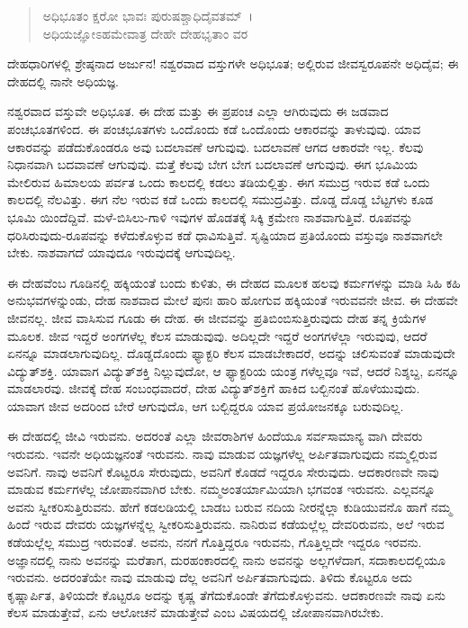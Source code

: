 \begin{verse}
ಅಧಿಭೂತಂ ಕ್ಷರೋ ಭಾವಃ ಪುರುಷಶ್ಚಾಧಿದೈವತಮ್~।\\ಅಧಿಯಜ್ಞೋಽಹಮೇವಾತ್ರ ದೇಹೇ ದೇಹಭೃತಾಂ ವರ 
\end{verse}

{\small ದೇಹಧಾರಿಗಳಲ್ಲಿ ಶ್ರೇಷ್ಠನಾದ ಅರ್ಜುನ! ನಶ್ವರವಾದ ವಸ್ತುಗಳೇ ಅಧಿಭೂತ; ಅಲ್ಲಿರುವ ಜೀವಸ್ವರೂಪನೇ ಅಧಿದೈವ; ಈ ದೇಹದಲ್ಲಿ ನಾನೇ ಅಧಿಯಜ್ಞ.}

ನಶ್ವರವಾದ ವಸ್ತುವೇ ಅಧಿಭೂತ. ಈ ದೇಹ ಮತ್ತು ಈ ಪ್ರಪಂಚ ಎಲ್ಲಾ ಆಗಿರುವುದು ಈ ಜಡವಾದ ಪಂಚಭೂತಗಳಿಂದ. ಈ ಪಂಚಭೂತಗಳು ಒಂದೊಂದು ಕಡೆ ಒಂದೊಂದು ಆಕಾರವನ್ನು ತಾಳುವುವು. ಯಾವ ಆಕಾರವನ್ನು ಪಡೆದುಕೊಂಡರೂ ಅವು ಬದಲಾವಣೆ ಆಗುವುವು. ಬದಲಾವಣೆ ಆಗದ ಆಕಾರವೇ ಇಲ್ಲ. ಕೆಲವು ನಿಧಾನವಾಗಿ ಬದವಾವಣೆ ಆಗುವುವು. ಮತ್ತೆ ಕೆಲವು ಬೇಗ ಬೇಗ ಬದಲಾವಣೆ ಆಗುವುವು. ಈಗ ಭೂಮಿಯ ಮೇಲಿರುವ ಹಿಮಾಲಯ ಪರ್ವತ ಒಂದು ಕಾಲದಲ್ಲಿ ಕಡಲು ತಡಿಯಲ್ಲಿತ್ತು. ಈಗ ಸಮುದ್ರ ಇರುವ ಕಡೆ ಒಂದು ಕಾಲದಲ್ಲಿ ನೆಲವಿತ್ತು. ಈಗ ನೆಲ ಇರುವ ಕಡೆ ಒಂದು ಕಾಲದಲ್ಲಿ ಸಮುದ್ರವಿತ್ತು. ದೊಡ್ಡ ದೊಡ್ಡ ಬೆಟ್ಟಗಳು ಕೂಡ ಭೂಮಿ ಯಿಂದೆದ್ದಿವೆ. ಮಳೆ-ಬಿಸಿಲು-ಗಾಳಿ ಇವುಗಳ ಹೊಡತಕ್ಕೆ ಸಿಕ್ಕಿ ಕ್ರಮೇಣ ನಾಶವಾಗುತ್ತಿವೆ. ರೂಪವನ್ನು ಧರಿಸಿರುವುದು-ರೂಪವನ್ನು ಕಳೆದುಕೊಳ್ಳುವ ಕಡೆ ಧಾವಿಸುತ್ತಿವೆ. ಸೃಷ್ಟಿಯಾದ ಪ್ರತಿಯೊಂದು ವಸ್ತುವೂ ನಾಶವಾಗಲೇ ಬೇಕು. ನಾಶವಾಗದೆ ಯಾವುದೂ ಇರುವುದಕ್ಕೆ ಆಗುವುದಿಲ್ಲ. 

ಈ ದೇಹವೆಂಬ ಗೂಡಿನಲ್ಲಿ ಹಕ್ಕಿಯಂತೆ ಬಂದು ಕುಳಿತು, ಈ ದೇಹದ ಮೂಲಕ ಹಲವು ಕರ್ಮಗಳನ್ನು ಮಾಡಿ ಸಿಹಿ ಕಹಿ ಅನುಭವಗಳನ್ನುಂಡು, ದೇಹ ನಾಶವಾದ ಮೇಲೆ ಪುನಃ ಹಾರಿ ಹೋಗುವ ಹಕ್ಕಿಯಂತೆ ಇರುವವನೇ ಜೀವ. ಈ ದೇಹವೇ ಜೀವನಲ್ಲ. ಜೀವ ವಾಸಿಸುವ ಗೂಡು ಈ ದೇಹ. ಈ ಜೀವವನ್ನು ಪ್ರತಿಬಿಂಬಿಸುತ್ತಿರುವುದು ದೇಹ ತನ್ನ ಕ್ರಿಯೆಗಳ ಮೂಲಕ. ಜೀವ ಇದ್ದರೆ ಅಂಗಗಳೆಲ್ಲ ಕೆಲಸ ಮಾಡುವುವು. ಅದಿಲ್ಲದೇ ಇದ್ದರೆ ಅಂಗಗಳೆಲ್ಲಾ ಇರುವುವು, ಆದರೆ ಏನನ್ನೂ ಮಾಡಲಾಗುವುದಿಲ್ಲ. ದೊಡ್ಡದೊಂದು ಫ್ಯಾಕ್ಟರಿ ಕೆಲಸ ಮಾಡಬೇಕಾದರೆ, ಅದನ್ನು ಚಲಿಸುವಂತೆ ಮಾಡುವುದೇ ವಿದ್ಯುತ್​ಶಕ್ತಿ. ಯಾವಾಗ ವಿದ್ಯುತ್​ಶಕ್ತಿ ನಿಲ್ಲುವುದೋ, ಆ ಫ್ಯಾಕ್ಟರಿಯ ಯಂತ್ರ ಗಳೆಲ್ಲವೂ ಇವೆ, ಆದರೆ ನಿಶ್ಶಬ್ದ, ಏನನ್ನೂ ಮಾಡಲಾರವು. ಜೀವಕ್ಕೆ ದೇಹ ಸಂಬಂಧವಾದರೆ, ದೇಹ ವಿದ್ಯುತ್​ಶಕ್ತಿಗೆ ಹಾಕಿದ ಬಲ್ಬಿನಂತೆ ಹೊಳೆಯುವುದು. ಯಾವಾಗ ಜೀವ ಅದರಿಂದ ಬೇರೆ ಆಗುವುದೊ, ಆಗ ಬಲ್ಬಿದ್ದರೂ ಯಾವ ಪ್ರಯೋಜನಕ್ಕೂ ಬರುವುದಿಲ್ಲ.

ಈ ದೇಹದಲ್ಲಿ ಜೀವಿ ಇರುವನು. ಅದರಂತೆ ಎಲ್ಲಾ ಜೀವರಾಶಿಗಳ ಹಿಂದೆಯೂ ಸರ್ವಸಾಮಾನ್ಯ ವಾಗಿ ದೇವರು ಇರುವನು. ಇವನೇ ಅಧಿಯಜ್ಞನಂತೆ ಇರುವನು. ನಾವು ಮಾಡುವ ಯಜ್ಞಗಳೆಲ್ಲ ಅರ್ಪಿತವಾಗುವುದು ನಮ್ಮಲ್ಲಿರುವ ಅವನಿಗೆ. ನಾವು ಅವನಿಗೆ ಕೊಟ್ಟರೂ ಸೇರುವುದು, ಅವನಿಗೆ ಕೊಡದೆ ಇದ್ದರೂ ಸೇರುವುದು. ಆದಕಾರಣವೇ ನಾವು ಮಾಡುವ ಕರ್ಮಗಳೆಲ್ಲ ಜೋಪಾನವಾಗಿರ ಬೇಕು. ನಮ್ಮಅಂತರ್ಯಾಮಿಯಾಗಿ ಭಗವಂತ ಇರುವನು. ಎಲ್ಲವನ್ನೂ ಅವನು ಸ್ವೀಕರಿಸುತ್ತಿರುವನು. ಹೇಗೆ ಕಡಲಡಿಯಲ್ಲಿ ಬಾಡಬ ಬರುವ ನದಿಯ ನೀರನ್ನೆಲ್ಲಾ ಕುಡಿಯುವನೊ ಹಾಗೆ ನಮ್ಮ ಹಿಂದೆ ಇರುವ ದೇವರು ಯಜ್ಞಗಳನ್ನೆಲ್ಲ ಸ್ವೀಕರಿಸುತ್ತಿರುವನು. ನಾನಿರುವ ಕಡೆಯಲ್ಲೆಲ್ಲ ದೇವರಿರುವನು, ಅಲೆ ಇರುವ ಕಡೆಯಲ್ಲೆಲ್ಲ ಸಮುದ್ರ ಇರುವಂತೆ. ಅವನು, ನನಗೆ ಗೊತ್ತಿದ್ದರೂ ಇರುವನು, ಗೊತ್ತಿಲ್ಲದೇ ಇದ್ದರೂ ಇರವನು. ಅಜ್ಞಾನದಲ್ಲಿ ನಾನು ಅವನನ್ನು ಮರೆತಾಗ, ದುರಹಂಕಾರದಲ್ಲಿ ನಾನು ಅವನನ್ನು ಅಲ್ಲಗಳೆದಾಗ, ಸದಾಕಾಲದಲ್ಲಿಯೂ ಇರುವನು. ಅದರಂತೆಯೇ ನಾವು ಮಾಡುವು ದೆಲ್ಲ ಅವನಿಗೆ ಅರ್ಪಿತವಾಗುವುದು. ತಿಳಿದು ಕೊಟ್ಟರೂ ಅದು ಕೃಷ್ಣಾರ್ಪಿತ, ತಿಳಿಯದೇ ಕೊಟ್ಟರೂ ಅದನ್ನು ಕೃಷ್ಣ ತೆಗೆದುಕೊಂಡೇ ತೆಗೆದುಕೊಳ್ಳುವನು. ಆದಕಾರಣವೇ ನಾವು ಏನು ಕೆಲಸ ಮಾಡುತ್ತೇವೆ, ಏನು ಆಲೋಚನೆ ಮಾಡುತ್ತೇವೆ ಎಂಬ ವಿಷಯದಲ್ಲಿ ಜೋಪಾನವಾಗಿರಬೇಕು.

